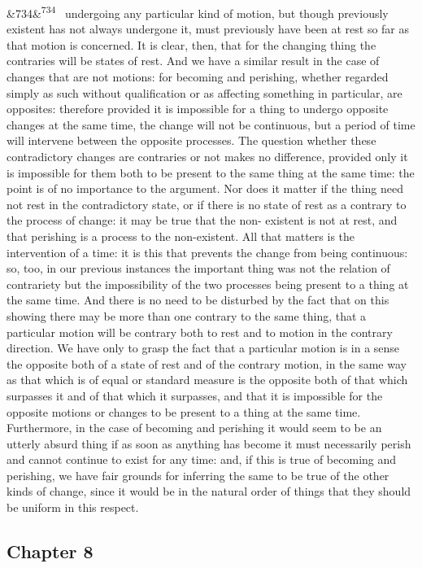 \documentclass[12pt]{article}
\newcommand{\para}[1][]{\par\noindent\ifx&#1&\else\textsuperscript{\footnotesize #1}~\fi}
\begin{document}
\para[734] undergoing any particular kind of motion, but though previously existent has not always undergone it, must previously have been at rest so far as that motion is concerned. It is clear, then, that for the changing thing the contraries will be states of rest. And we have a similar result in the case of changes that are not motions: for becoming and perishing, whether regarded simply as such without qualification or as affecting something in particular, are opposites: therefore provided it is impossible for a thing to undergo opposite changes at the same time, the change will not be continuous, but a period of time will intervene between the opposite processes. The question whether these contradictory changes are contraries or not makes no difference, provided only it is impossible for them both to be present to the same thing at the same time: the point is of no importance to the argument. Nor does it matter if the thing need not rest in the contradictory state, or if there is no state of rest as a contrary to the process of change: it may be true that the non- existent is not at rest, and that perishing is a process to the non-existent. All that matters is the intervention of a time: it is this that prevents the change from being continuous: so, too, in our previous instances the important thing was not the relation of contrariety but the impossibility of the two processes being present to a thing at the same time. And there is no need to be disturbed by the fact that on this showing there may be more than one contrary to the same thing, that a particular motion will be contrary both to rest and to motion in the contrary direction. We have only to grasp the fact that a particular motion is in a sense the opposite both of a state of rest and of the contrary motion, in the same way as that which is of equal or standard measure is the opposite both of that which surpasses it and of that which it surpasses, and that it is impossible for the opposite motions or changes to be present to a thing at the same time. Furthermore, in the case of becoming and perishing it would seem to be an utterly absurd thing if as soon as anything has become it must necessarily perish and cannot continue to exist for any time: and, if this is true of becoming and perishing, we have fair grounds for inferring the same to be true of the other kinds of change, since it would be in the natural order of things that they should be uniform in this respect.

\subsection*{Chapter 8}
\end{document}
